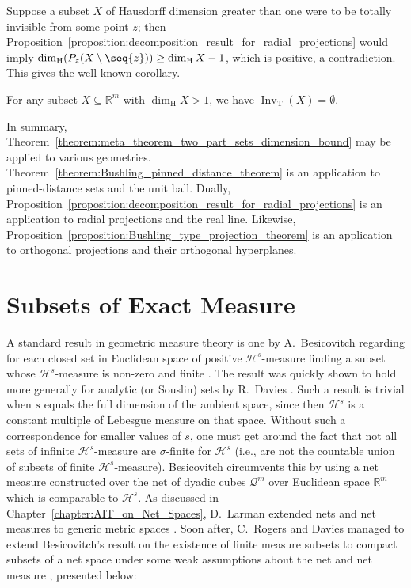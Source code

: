 Suppose a subset $X$ of Hausdorff dimension greater than one were to be totally invisible from some point $z$; then Proposition~\ref{proposition:decomposition_result_for_radial_projections} would imply $\dim_{\operatorname{H}}(P_z(X \setminus \seq{z})) \geq \dim_{\operatorname{H}} X - 1$, which is positive, a contradiction. This gives the well-known corollary.

\begin{corollary}
    For any subset $X \subseteq \mathbb{R}^m$ with $\dim_{\operatorname{H}} X > 1$, we have $\operatorname{Inv}_{\operatorname{T}}(X) = \emptyset$.
\end{corollary}

In summary, Theorem~\ref{theorem:meta_theorem_two_part_sets_dimension_bound} may be applied to various geometries. Theorem~\ref{theorem:Bushling_pinned_distance_theorem} is an application to pinned-distance sets and the unit ball. Dually, Proposition~\ref{proposition:decomposition_result_for_radial_projections} is an application to radial projections and the real line. Likewise, Proposition~\ref{proposition:Bushling_type_projection_theorem} is an application to orthogonal projections and their orthogonal hyperplanes.

\section{Subsets of Exact Measure}
\label{section:subsets_of_exact_measure}

A standard result in geometric measure theory is one by A.~Besicovitch regarding for each closed set in Euclidean space of positive $\mathcal{H}^s$-measure finding a subset whose $\mathcal{H}^s$-measure is non-zero and finite \cite{Bes52}. The result was quickly shown to hold more generally for analytic (or Souslin) sets by R.~Davies \cite{Dav52}. Such a result is trivial when $s$ equals the full dimension of the ambient space, since then $\mathcal{H}^s$ is a constant multiple of Lebesgue measure on that space. Without such a correspondence for smaller values of $s$, one must get around the fact that not all sets of infinite $\mathcal{H}^s$-measure are $\sigma$-finite for $\mathcal{H}^s$ (i.e., are not the countable union of subsets of finite $\mathcal{H}^s$-measure). Besicovitch circumvents this by using a net measure constructed over the net of dyadic cubes $\mathcal{Q}^m$ over Euclidean space $\mathbb{R}^m$ which is comparable to $\mathcal{H}^s$. As discussed in Chapter~\ref{chapter:AIT_on_Net_Spaces}, D.~Larman extended nets and net measures to generic metric spaces \cite{Lar67}. Soon after, C.~Rogers and Davies managed to extend Besicovitch's result on the existence of finite measure subsets to compact subsets of a net space under some weak assumptions about the net and net measure \cite{Rog70}, presented below:

